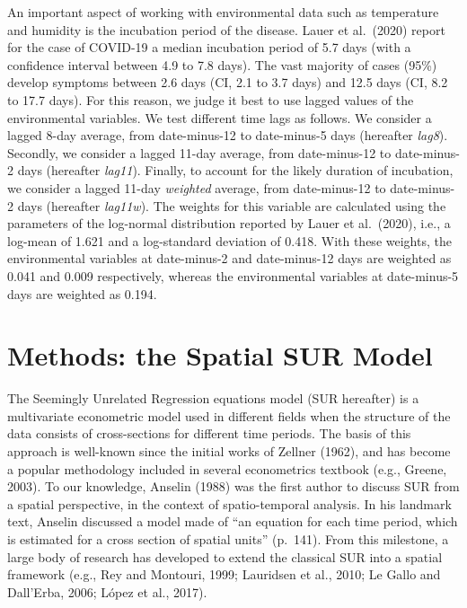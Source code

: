 \documentclass[]{elsarticle} %
\begin{document}
An important aspect of working with environmental data such as
temperature and humidity is the incubation period of the disease. Lauer
et al.~(2020) report for the case of COVID-19 a median incubation period
of 5.7 days (with a confidence interval between 4.9 to 7.8 days). The
vast majority of cases (95\%) develop symptoms between 2.6 days (CI, 2.1
to 3.7 days) and 12.5 days (CI, 8.2 to 17.7 days). For this reason, we
judge it best to use lagged values of the environmental variables. We
test different time lags as follows. We consider a lagged 8-day average,
from date-minus-12 to date-minus-5 days (hereafter \emph{lag8}).
Secondly, we consider a lagged 11-day average, from date-minus-12 to
date-minus-2 days (hereafter \emph{lag11}). Finally, to account for the
likely duration of incubation, we consider a lagged 11-day
\emph{weighted} average, from date-minus-12 to date-minus-2 days
(hereafter \emph{lag11w}). The weights for this variable are calculated
using the parameters of the log-normal distribution reported by Lauer et
al.~(2020), i.e., a log-mean of 1.621 and a log-standard deviation of
0.418. With these weights, the environmental variables at date-minus-2
and date-minus-12 days are weighted as 0.041 and 0.009 respectively,
whereas the environmental variables at date-minus-5 days are weighted as
0.194.

\hypertarget{methods}{%
\section{Methods: the Spatial SUR Model}\label{methods}}

The Seemingly Unrelated Regression equations model (SUR hereafter) is a
multivariate econometric model used in different fields when the
structure of the data consists of cross-sections for different time
periods. The basis of this approach is well-known since the initial
works of Zellner (1962), and has become a popular methodology included
in several econometrics textbook (e.g., Greene, 2003). To our knowledge,
Anselin (1988) was the first author to discuss SUR from a spatial
perspective, in the context of spatio-temporal analysis. In his landmark
text, Anselin discussed a model made of ``an equation for each time
period, which is estimated for a cross section of spatial units''
(p.~141). From this milestone, a large body of research has developed to
extend the classical SUR into a spatial framework (e.g., Rey and
Montouri, 1999; Lauridsen et al., 2010; Le Gallo and Dall'Erba, 2006;
López et al., 2017).
\end{document}

